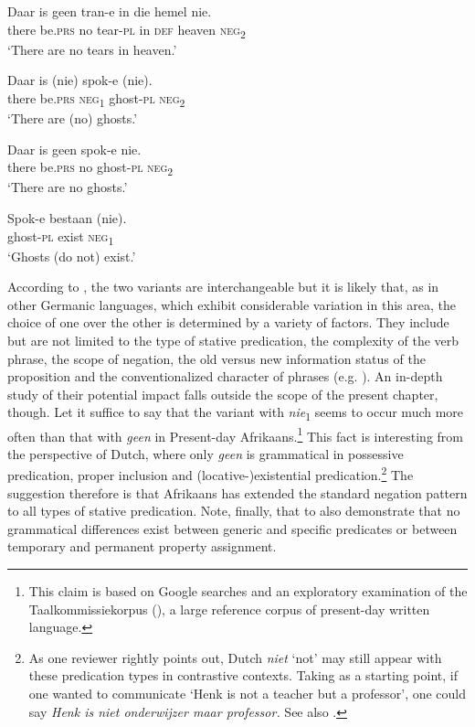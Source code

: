 \documentclass[output=paper,colorlinks,citecolor=brown]{langscibook}
\begin{document}
    \ex\label{ex:afr:17b}
        \gll Daar is geen tran-e in die hemel nie. \\
             there be.\textsc{prs} no tear-\textsc{pl} in  \textsc{def} heaven  \textsc{neg}\textsubscript{2} \\
        \glt ‘There are no tears in heaven.’
    \z
\z 

\ea\label{ex:afr:18}
    \ea\label{ex:afr:18a}
        \gll Daar is (nie) spok-e (nie). \\ 
             there  be.\textsc{prs}  \textsc{neg}\textsubscript{1} ghost-\textsc{pl} \textsc{neg}\textsubscript{2} \\
        \glt ‘There are (no) ghosts.’
    
    \ex\label{ex:afr:18b}
        \gll Daar is geen spok-e nie. \\
             there be.\textsc{prs} no ghost-\textsc{pl} \textsc{neg}\textsubscript{2}\\
        \glt ‘There are no ghosts.’

    \ex\label{ex:afr:18c}
        \gll Spok-e bestaan (nie). \\
             ghost-\textsc{pl} exist    \textsc{neg}\textsubscript{1} \\
        \glt  ‘Ghosts (do not) exist.’   
    \z
\z 

According to \citet[413]{Donaldson1993}, the two variants are interchangeable but it is likely that, as in other Germanic languages, which exhibit considerable variation in this area, the choice of one over the other is determined by a variety of factors. They include but are not limited to the type of stative predication, the complexity of the verb phrase, the scope of negation, the old versus new information status of the proposition and the conventionalized character of phrases (e.g. \citealt{Peters2008, Bordal2017, BurnettEtAl2018, Wallage2020}). An in-depth study of their potential impact falls outside the scope of the present chapter, though. Let it suffice to say that the variant with \textit{nie}\textsubscript{1} seems to occur much more often than that with \textit{geen} in Present-day Afrikaans.\footnote{This claim is based on Google searches and an exploratory examination of the Taalkommissiekorpus (\citealt{VirtueleInstituutvirAfrikaans2019}), a large reference corpus of present-day written language.} This fact is interesting from the perspective of Dutch, where only \textit{geen} is grammatical in possessive predication, proper inclusion and (locative-)existential predication.\footnote{As one reviewer rightly points out, Dutch \textit{niet} ‘not’ may still appear with these predication types in contrastive contexts. Taking  as a starting point, if one wanted to communicate ‘Henk is not a teacher but a professor’, one could say \textit{Henk is niet onderwijzer maar professor.} See also .} The suggestion therefore is that Afrikaans has extended the standard negation pattern to all types of stative predication. Note, finally, that  to  also demonstrate that no grammatical differences exist between generic and specific predicates or between temporary and permanent property assignment.
\end{document}
